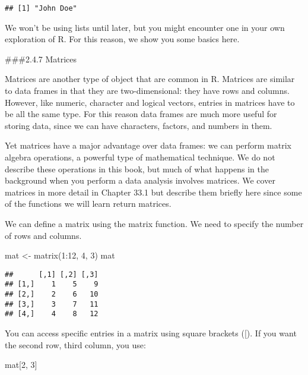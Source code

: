 \documentclass[
]{article}
\newenvironment{Shaded}{\begin{snugshade}}{\end{snugshade}}
\newcommand{\DecValTok}[1]{\textcolor[rgb]{0.00,0.00,0.81}{#1}}
\newcommand{\FunctionTok}[1]{\textcolor[rgb]{0.00,0.00,0.00}{#1}}
\newcommand{\NormalTok}[1]{#1}
\newcommand{\OtherTok}[1]{\textcolor[rgb]{0.56,0.35,0.01}{#1}}
\newcommand{\SpecialCharTok}[1]{\textcolor[rgb]{0.00,0.00,0.00}{#1}}
\begin{document}
\begin{verbatim}
## [1] "John Doe"
\end{verbatim}

We won't be using lists until later, but you might encounter one in your
own exploration of R. For this reason, we show you some basics here.

\#\#\#2.4.7 Matrices

Matrices are another type of object that are common in R. Matrices are
similar to data frames in that they are two-dimensional: they have rows
and columns. However, like numeric, character and logical vectors,
entries in matrices have to be all the same type. For this reason data
frames are much more useful for storing data, since we can have
characters, factors, and numbers in them.

Yet matrices have a major advantage over data frames: we can perform
matrix algebra operations, a powerful type of mathematical technique. We
do not describe these operations in this book, but much of what happens
in the background when you perform a data analysis involves matrices. We
cover matrices in more detail in Chapter 33.1 but describe them briefly
here since some of the functions we will learn return matrices.

We can define a matrix using the matrix function. We need to specify the
number of rows and columns.

\begin{Shaded}
\begin{Highlighting}[]
\NormalTok{mat }\OtherTok{\textless{}{-}} \FunctionTok{matrix}\NormalTok{(}\DecValTok{1}\SpecialCharTok{:}\DecValTok{12}\NormalTok{, }\DecValTok{4}\NormalTok{, }\DecValTok{3}\NormalTok{)}
\NormalTok{mat}
\end{Highlighting}
\end{Shaded}

\begin{verbatim}
##      [,1] [,2] [,3]
## [1,]    1    5    9
## [2,]    2    6   10
## [3,]    3    7   11
## [4,]    4    8   12
\end{verbatim}

You can access specific entries in a matrix using square brackets ({[}).
If you want the second row, third column, you use:

\begin{Shaded}
\begin{Highlighting}[]
\NormalTok{mat[}\DecValTok{2}\NormalTok{, }\DecValTok{3}\NormalTok{]}
\end{Highlighting}
\end{Shaded}
\end{document}
